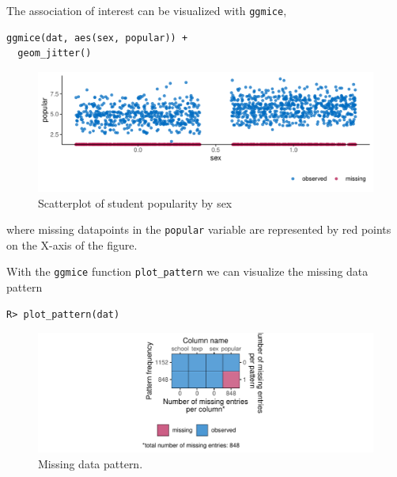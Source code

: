 \documentclass[
  article]{jss}
\begin{document}
The association of interest can be visualized with \texttt{ggmice},

\begin{verbatim}
ggmice(dat, aes(sex, popular)) +
  geom_jitter()
\end{verbatim}

\begin{figure}[h]

{\centering \includegraphics{manuscript_files/figure-pdf/unnamed-chunk-8-1.pdf}

}

\caption{Scatterplot of student popularity by sex}

\end{figure}

where missing datapoints in the \texttt{popular} variable are
represented by red points on the X-axis of the figure.

With the \texttt{ggmice} function \texttt{plot\_pattern} we can
visualize the missing data pattern

\begin{verbatim}
R> plot_pattern(dat)
\end{verbatim}

\begin{figure}[h]

{\centering \includegraphics{manuscript_files/figure-pdf/fig-pattern-1.pdf}

}

\caption{\label{fig-pattern}Missing data pattern.}

\end{figure}
\end{document}
